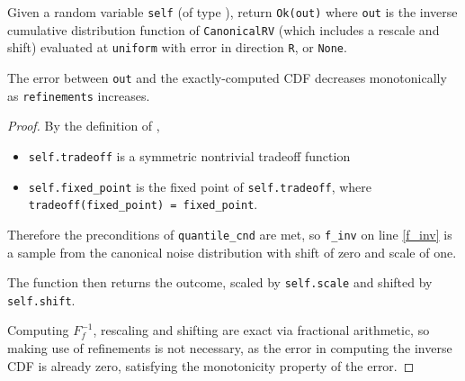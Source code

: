 \documentclass{article}
\begin{document}
\begin{theorem}
Given a random variable \texttt{self} (of type ),
return \texttt{Ok(out)} where \texttt{out} is the inverse cumulative distribution function of \texttt{CanonicalRV} (which includes a rescale and shift) evaluated at \texttt{uniform}
with error in direction \texttt{R}, or \texttt{None}.

The error between \texttt{out} and the exactly-computed CDF decreases monotonically as \texttt{refinements} increases.
\end{theorem}

\begin{proof} 

By the definition of ,
\begin{itemize}
    \item \texttt{self.tradeoff} is a symmetric nontrivial tradeoff function
    \item \texttt{self.fixed\_point} is the fixed point of \texttt{self.tradeoff}, where \texttt{tradeoff(fixed\_point) = fixed\_point}.
\end{itemize}

Therefore the preconditions of \texttt{quantile\_cnd} are met,
so \texttt{f\_inv} on line \ref{f_inv} is a sample from the canonical noise distribution with shift of zero and scale of one.

The function then returns the outcome, scaled by \texttt{self.scale} and shifted by \texttt{self.shift}.

Computing $F_f^{-1}$, rescaling and shifting are exact via fractional arithmetic, 
so making use of refinements is not necessary, 
as the error in computing the inverse CDF is already zero, satisfying the monotonicity property of the error.

\end{proof}
\end{document}
